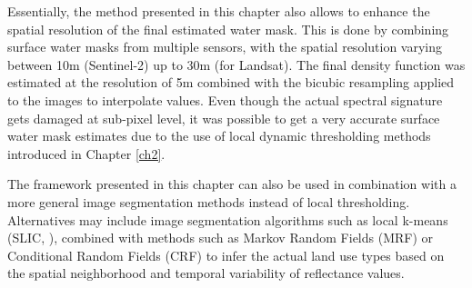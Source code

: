 Essentially, the method presented in this chapter also allows to enhance the spatial resolution of the final estimated water mask. This is done by combining surface water masks from multiple sensors, with the spatial resolution varying between 10m (Sentinel-2) up to 30m (for Landsat). The final density function was estimated at the resolution of 5m combined with the bicubic resampling applied to the images to interpolate values. Even though the actual spectral signature gets damaged at sub-pixel level, it was possible to get a very accurate surface water mask estimates due to the use of local dynamic thresholding methods introduced in Chapter \ref{ch2}.

The framework presented in this chapter can also be used in combination with a more general image segmentation methods instead of local thresholding. Alternatives may include image segmentation algorithms such as local k-means (SLIC, \citep{achanta2012slic}), combined with methods such as Markov Random Fields (MRF) or Conditional Random Fields (CRF) to infer the actual land use types based on the spatial neighborhood and temporal variability of reflectance values.
